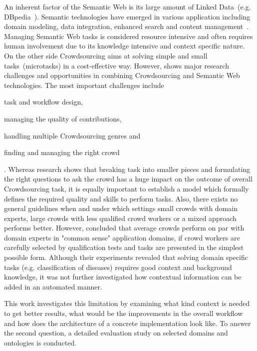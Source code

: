 \documentclass[12pt, notitlepage]{article}
\begin{document}
An inherent factor of the Semantic Web is its large amount of Linked Data~(e.g. DBpedia~\cite{lehmann2015dbpedia}). Semantic technologies have emerged in various application including domain modeling, data integration, enhanced search and content management~\cite{semantic-web-usecases}. Managing Semantic Web tasks is considered resource intensive and often requires human involvement due to its knowledge intensive and context specific nature. On the other side Crowdsourcing aims at solving simple and small tasks~(microtasks) in a cost-effective way. However, \citet{sarasua2015crowdsourcing} shows major research challenges and opportunities in combining Crowdsourcing and Semantic Web technologies. The most important challenges include 
\begin{inparaenum}[1)]
		\item task and workflow design,
		\item managing the quality of contributions,
		\item handling multiple Crowdsourcing genres and 
		\item finding and managing the right crowd
\end{inparaenum}.
Whereas research shows that breaking task into smaller pieces and formulating the right questions to ask the crowd has a huge impact on the outcome of overall Crowdsourcing task, it is equally important to establish a model which formally defines the required quality and skills to perform tasks. Also, there exists no general guidelines when and under which settings small crowds with domain experts, large crowds with less qualified crowd workers or a mixed approach performs better. However, \citet{mortensen2013developing} concluded that average crowds perform on par with domain experts in "common sense" application domains, if crowd workers are carefully selected by qualification tests and tasks are presented in the simplest possible form. Although their experiments revealed that solving domain specific tasks (e.g. classification of diseases) requires good context and background knowledge, it was not further investigated how contextual information can be added in an automated manner. 

This work investigates this limitation by examining what kind context is needed to get better results, what would be the improvements in the overall workflow and how does the architecture of a concrete implementation look like. To answer the second question, a detailed evaluation study on selected domains and ontologies is conducted.
\end{document}
